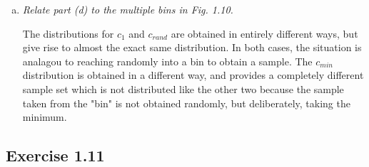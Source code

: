 \documentclass{article}
\begin{document}
\begin{enumerate}[(a)]
  \item \textit{Relate part (d) to the multiple bins in Fig. 1.10.}

    The distributions for $c_1$ and $c_{rand}$ are obtained in entirely different ways, 
    but give rise to almost the exact same distribution. In both cases, the situation is
    analagou to reaching randomly into a bin to obtain a sample. The $c_{min}$ distribution 
    is obtained in a different way, and provides a completely different sample set which is not 
    distributed like the other two because the sample taken from the "bin" is not obtained
    randomly, but deliberately, taking the minimum.

\end{enumerate}

\subsection*{Exercise 1.11}
\end{document}
